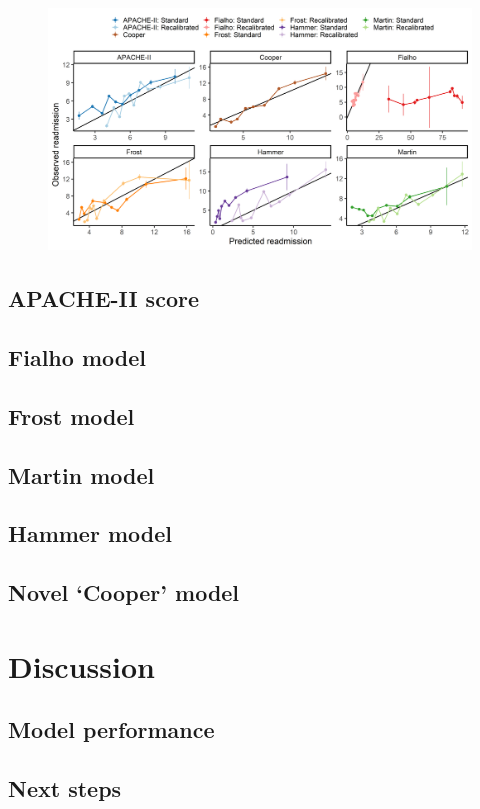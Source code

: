 \documentclass[onecolumn]{article}
\begin{document}
\begin{figure}
\centering
	\includegraphics[width=\textwidth]{calibration.png}
	\caption{}
	\label{CalibrationFig}
\end{figure}

\subsection{APACHE-II score}

\subsection{Fialho model}

\subsection{Frost model}

\subsection{Martin model}

\subsection{Hammer model}

\subsection{Novel `Cooper' model}


\section{Discussion}

\subsection{Model performance}


\subsection{Next steps}


\begin{multicols}{2}

{\small
}

\end{multicols}
\end{document}
